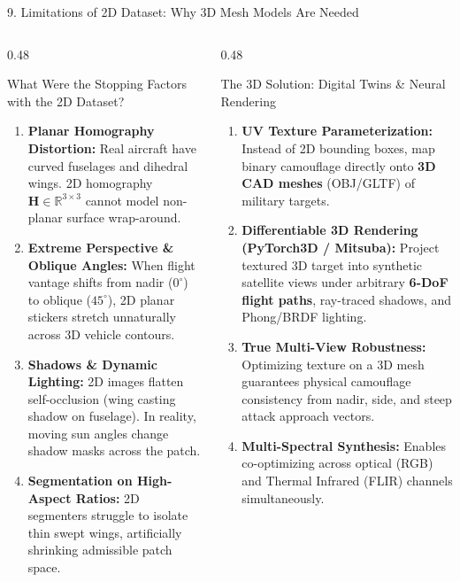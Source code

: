 \documentclass[aspectratio=169, 10pt]{beamer}
\begin{document}
\begin{frame}{9. Limitations of 2D Dataset: Why 3D Mesh Models Are Needed}
\begin{columns}[T]
  \begin{column}{0.48\textwidth}
    \begin{alertblock}{What Were the Stopping Factors with the 2D Dataset?}
      \begin{enumerate}\small
        \item \textbf{Planar Homography Distortion:} Real aircraft have curved fuselages and dihedral wings. 2D homography $\mathbf{H} \in \mathbb{R}^{3 \times 3}$ cannot model non-planar surface wrap-around.
        \item \textbf{Extreme Perspective \& Oblique Angles:} When flight vantage shifts from nadir ($0^\circ$) to oblique ($45^\circ$), 2D planar stickers stretch unnaturally across 3D vehicle contours.
        \item \textbf{Shadows \& Dynamic Lighting:} 2D images flatten self-occlusion (wing casting shadow on fuselage). In reality, moving sun angles change shadow masks across the patch.
        \item \textbf{Segmentation on High-Aspect Ratios:} 2D segmenters struggle to isolate thin swept wings, artificially shrinking admissible patch space.
      \end{enumerate}
    \end{alertblock}
  \end{column}

  \begin{column}{0.48\textwidth}
    \begin{exampleblock}{The 3D Solution: Digital Twins \& Neural Rendering}
      \begin{enumerate}\small
        \item \textbf{UV Texture Parameterization:} Instead of 2D bounding boxes, map binary camouflage directly onto \textbf{3D CAD meshes} (OBJ/GLTF) of military targets.
        \item \textbf{Differentiable 3D Rendering (PyTorch3D / Mitsuba):}
        Project textured 3D target into synthetic satellite views under arbitrary \textbf{6-DoF flight paths}, ray-traced shadows, and Phong/BRDF lighting.
        \item \textbf{True Multi-View Robustness:} Optimizing texture on a 3D mesh guarantees physical camouflage consistency from nadir, side, and steep attack approach vectors.
        \item \textbf{Multi-Spectral Synthesis:} Enables co-optimizing across optical (RGB) and Thermal Infrared (FLIR) channels simultaneously.
      \end{enumerate}
    \end{exampleblock}
  \end{column}
\end{columns}
\end{frame}
\end{document}
